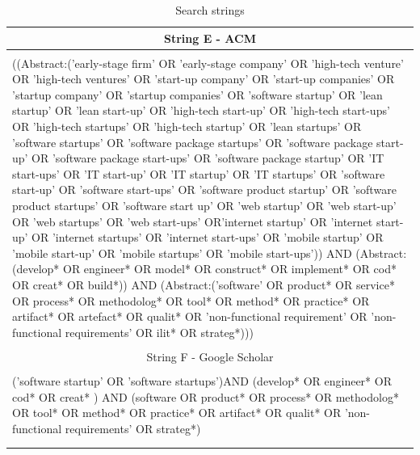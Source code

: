 \documentclass[final,5p,times,twocolumn]{elsarticle}
\begin{document}
\begin{longtable}{|p{5.3in}|}
\multicolumn{1}{|c|}{String E - ACM \cite{ACMsearch}} \\
\hline 
\hspace{1in}\\
((Abstract:('early-stage firm' OR 'early-stage company' OR 'high-tech venture' OR 'high-tech ventures' OR 'start-up company' OR 'start-up companies' OR 'startup company' OR 'startup companies' OR 'software startup' OR 'lean startup' OR 'lean start-up' OR 'high-tech start-up' OR 'high-tech start-ups' OR 'high-tech startups' OR 'high-tech startup' OR 'lean startups' OR 'software startups' OR 'software package startups' OR 'software package start-up' OR 'software package start-ups' OR 'software package startup' OR 'IT start-ups' OR 'IT start-up' OR 'IT startup' OR 'IT startups' OR 'software start-up' OR 'software start-ups' OR 'software product startup' OR 'software product startups' OR 'software start up' OR 'web startup' OR 'web start-up' OR 'web startups' OR 'web start-ups' OR'internet startup' OR 'internet start-up' OR 'internet startups' OR 'internet start-ups' OR 'mobile startup' OR 'mobile start-up' OR 'mobile startups' OR 'mobile start-ups')) AND (Abstract:(develop* OR engineer* OR model* OR construct* OR implement* OR cod* OR creat* OR build*)) AND (Abstract:('software' OR product* OR service* OR process* OR methodolog* OR tool* OR method* OR practice* OR artifact* OR artefact*  OR qualit* OR 'non-functional requirement' OR 'non-functional requirements' OR ilit* OR strateg*))) \\
\hspace{3in}\\
\hline  \hline

 
\multicolumn{1}{|c|}{String F - Google Scholar \cite{gScholar}} \\
\hline  
\hspace{1in}\\
('software startup' OR 'software startups')AND (develop* OR engineer* OR cod* OR creat* ) AND (software OR product* OR process* OR methodolog* OR tool* OR method* OR practice* OR artifact* OR qualit* OR 'non-functional requirements' OR strateg*)  \\
\hspace{3in}\\
\hline  \hline 
\caption{Search strings}\label{tab:ms:search-strings}\\

 \end{longtable}

\small
\twocolumn
\end{document}
